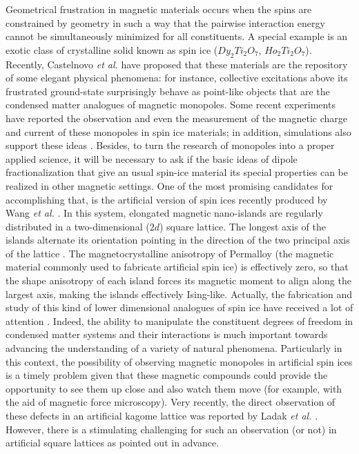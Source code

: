 \documentclass[aps,prb,twocolumn,floatfix,showpacs,amsmath,amssymb]{revtex4}
\begin{document}
\indent  Geometrical frustration in magnetic materials occurs when
the spins are constrained by geometry in such a way that the
pairwise interaction energy cannot be simultaneously minimized for
all constituents. A special example is an exotic class of
crystalline solid known as spin ice ($Dy_{2}Ti_{2}O_{7}$,
$Ho_{2}Ti_{2}O_{7}$). Recently, Castelnovo \emph{et al.}
\cite{Castelnovo08} have proposed that these materials are the
repository of some elegant physical phenomena: for instance,
collective excitations above its frustrated ground-state
surprisingly behave as point-like objects that are the condensed
matter analogues of magnetic monopoles. Some recent experiments
\cite{Fennell09,Morris09,Bramwell09,Kadowaki09} have reported the
observation and even the measurement of the magnetic charge and
current of these monopoles in spin ice materials; in addition,
simulations also support these ideas
\cite{Jaubert09,Castelnovo10}. Besides, to turn the research of
monopoles into a proper applied science, it will be necessary to
ask if the basic ideas of dipole
fractionalization\cite{Castelnovo08,Nussinov07} that give an usual
spin-ice material its special properties can be realized in other
magnetic settings. One of the most promising candidates for
accomplishing that, is the artificial version of spin ices
recently produced by Wang \emph{et al.} \cite{Wang06}.
%
In this system, elongated magnetic nano-islands are regularly distributed in a
two-dimensional ($2d$) square lattice. The longest axis of the
islands alternate its orientation pointing in the direction of the
two principal axis of the lattice \cite{Wang06}. The
magnetocrystalline anisotropy of Permalloy (the magnetic material
commonly used to fabricate artificial spin ice) is effectively zero, so
that the shape anisotropy of each island forces its magnetic
moment to align along the largest axis, making the islands
effectively Ising-like.
%
Actually, the fabrication and study of this kind of lower
dimensional analogues of spin ice have received a lot of attention
\cite{Wang06,Moller06,Remhof08,Ke08,Zabel09,Mol09,Libal09,Moller09}.
Indeed, the ability to manipulate the constituent degrees of
freedom in condensed matter systems and their interactions is much
important towards advancing the understanding of a variety of
natural phenomena. Particularly in this context, the possibility
of observing magnetic monopoles in artificial spin ices
\cite{Mol09,Moller09} is a timely problem given that these
magnetic compounds could provide the opportunity to see them up
close and also watch them move (for example, with the aid of
magnetic force microscopy). Very recently, the direct observation
of these defects in an artificial kagome lattice was reported by
Ladak \emph{et al.} \cite{Ladak10}. However, there is a
stimulating challenging for such an observation (or not) in
artificial square lattices as pointed out in advance.
\end{document}
